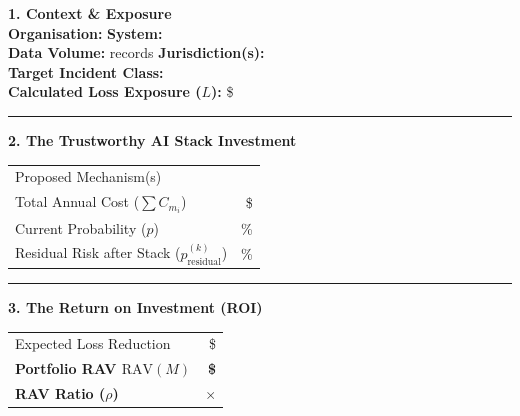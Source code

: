 \begin{tcolorbox}[formulabox,
  title={Trust ROI Calculator: CFO Summary Worksheet}]

\textbf{1. Context \& Exposure} \\
\textbf{Organisation:} \underline{\hspace{3.5cm}} \quad \textbf{System:} \underline{\hspace{3.5cm}} \\
\textbf{Data Volume:} \underline{\hspace{2cm}} records \quad \textbf{Jurisdiction(s):} \underline{\hspace{3cm}} \\
\textbf{Target Incident Class:} \underline{\hspace{6.8cm}} \\
\textbf{Calculated Loss Exposure ($L$):} \$ \underline{\hspace{3.5cm}}

\medskip
\hrule
\medskip

\textbf{2. The Trustworthy AI Stack Investment}
\begin{tabular}{@{}p{5cm} r@{}}
Proposed Mechanism(s) & \underline{\hspace{5.5cm}} \\
Total Annual Cost ($\sum C_{m_i}$) & \$ \underline{\hspace{5.5cm}} \\
Current Probability ($p$) & \underline{\hspace{5cm}} \% \\
Residual Risk after Stack ($p_{\mathrm{residual}}^{(k)}$) & \underline{\hspace{5cm}} \% \\
\end{tabular}

\medskip
\hrule
\medskip

\textbf{3. The Return on Investment (ROI)}
\begin{tabular}{@{}p{5cm} r@{}}
Expected Loss Reduction & \$ \underline{\hspace{5.5cm}} \\
\textbf{Portfolio RAV $\mathrm{RAV}(M)$} & \textbf{\$ \underline{\hspace{5.5cm}}} \\
\textbf{RAV Ratio ($\rho$)} & \textbf{\underline{\hspace{5.2cm}}$\times$} \\
\end{tabular}


\end{tcolorbox}
